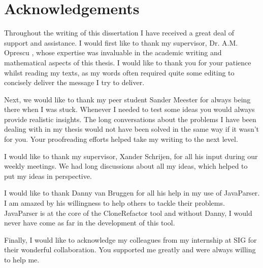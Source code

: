 \chapter*{Acknowledgements}
Throughout the writing of this dissertation I have received a great deal of support and assistance. I would first like to thank my supervisor, Dr. A.M. Oprescu , whose expertise was invaluable in the academic writing and mathematical aspects of this thesis. I would like to thank you for your patience whilst reading my texts, as my words often required quite some editing to concisely deliver the message I try to deliver.

Next, we would like to thank my peer student Sander Meester for always being there when I was stuck. Whenever I needed to test some ideas you would always provide realistic insights. The long conversations about the problems I have been dealing with in my thesis would not have been solved in the same way if it wasn't for you. Your proofreading efforts helped take my writing to the next level.

I would like to thank my supervisor, Xander Schrijen, for all his input during our weekly meetings. We had long discussions about all my ideas, which helped to put my ideas in perspective.

I would like to thank Danny van Bruggen for all his help in my use of JavaParser. I am amazed by his willingness to help others to tackle their problems. JavaParser is at the core of the CloneRefactor tool and without Danny, I would never have come as far in the development of this tool.

Finally, I would like to acknowledge my colleagues from my internship at SIG for their wonderful collaboration. You supported me greatly and were always willing to help me.
